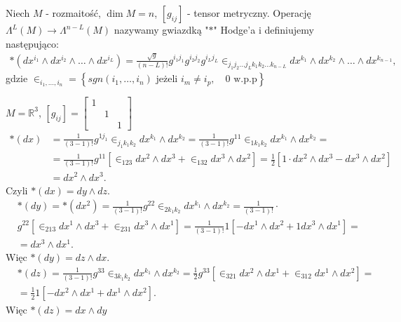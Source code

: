 \documentclass[../main.tex]{subfiles}
\begin{document}
    \begin{definicja}
        Niech $M$ - rozmaitość, $\dim M = n$, $\left[ g_{ij} \right] $ - tensor metryczny. Operację $\Lambda^L(M)\to \Lambda^{n-L}(M)$ nazywamy gwiazdką "$\ast$" Hodge'a i definiujemy następująco:
        \begin{align*}
            \ast\left( dx^{i_1}\land dx^{i_2}\land \ldots \land dx^{i_L} \right) = \frac{\sqrt{g} }{(n-L)!} g^{i_1j_1}g^{i_2j_2}g^{i_Lj_L}\in _{j_1j_2\ldots j_L k_1k_2\ldots k_{n-L}}dx^{k_1}\land dx^{k_2}\land \ldots \land dx^{k_{n-1}}
        ,\end{align*}
        gdzie $\in _{i_1,\ldots,i_n} = \left\{ sgn(i_1,\ldots,i_n) \text{ jeżeli } i_m \neq i_p,\quad 0 \text{ w.p.p} \right\}$
    \end{definicja}
    \begin{przyklad}
        $M = \mathbb{R}^3$, $\left[ g_{ij} \right] = \begin{bmatrix} 1&&\\&1&\\&&1 \end{bmatrix} $\\
        \begin{align*}
           \ast(dx) &= \frac{1}{(3-1)!}g^{1 j_1}\in _{j_1 k_1k_2}dx^{k_1}\land dx^{k_2} = \frac{1}{(3-1)!}g^{11}\in _{1k_1k_2}dx^{k_1}\land dx^{k_2} =\\
                    &= \frac{1}{(3-1)!}g^{11} \left[ \in_{1 2 3}dx^2\land dx^3 + \in_{1 3 2}dx^3\land dx^2 \right] = \frac{1}{2} \left[ 1\cdot dx^2 \land dx^3 - dx^3 \land dx^2 \right]  \\
                    &= dx^2\land dx^3
        .\end{align*}
        Czyli $\ast(dx) = dy \land dz$.\\
        \begin{align*}
            &\ast(dy) = \ast(dx^2) = \frac{1}{(3-1)!}g^{22}\in_{2k_1k_2} dx^{k_1}\land dx^{k_2} = \frac{1}{(3-1)!} \cdot \\
            &g^{22} \left[ \in_{2 1 3} dx^1\land dx^3 + \in _{2 3 1}dx^3\land dx^1 \right] = \frac{1}{(3-1)!} 1 \left[ -dx^1\land dx^2 + 1 dx^3 \land dx^1 \right] =\\
            &= dx^3 \land dx^1
        .\end{align*}
        Więc $\ast (dy) = dz\land dx$.\\
         \begin{align*}
             &\ast(dz) = \frac{1}{(3-1)!}g^{33}\in_{3k_1k_2}dx^{k_1}\land dx^{k_2} = \frac{1}{2}g^{33}\left[ \in_{321}dx^2\land dx^1 + \in_{312} dx^1 \land dx^2 \right]=\\
             &= \frac{1}{2} 1 \left[ -dx^2\land dx^1 + dx^1\land dx^2 \right]
        .\end{align*}
        Więc $\ast(dz) = dx\land dy$
    \end{przyklad}
\end{document}
